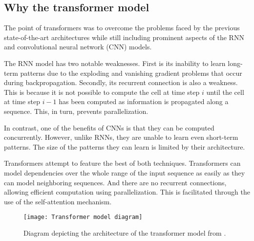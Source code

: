 \subsection{Why the transformer model}\label{sec:transformer intro}
The point of transformers was to overcome the problems faced by the previous state-of-the-art architectures while still including prominent aspects of the RNN and convolutional neural network (CNN) models.

The RNN model has two notable weaknesses. First is its inability to learn long-term patterns due to the exploding and vanishing gradient problems that occur during backpropagation.
Secondly, its recurrent connection is also a weakness. This is because it is not possible to compute the cell at time step $i$ until the cell at time step $i-1$ has been computed as information is propagated along a sequence.
This, in turn, prevents parallelization.

In contrast, one of the benefits of CNNs is that they can be computed concurrently. However, unlike RNNs, they are unable to learn even short-term patterns. The size of the patterns they can learn is limited by their architecture.

Transformers attempt to feature the best of both techniques.
Transformers can model dependencies over the whole range of the input sequence as easily as they can  model neighboring sequences. And there are no recurrent connections, allowing efficient computation using parallelization. This is facilitated through the use of the self-attention mechanism.\cite{TransformersScratchPeterbloem}

\begin{figure}[h]
  \centering
  \texttt{[image: Transformer model diagram]}
  \caption{Diagram depicting the architecture of the transformer model from \citet{AttentionIsAllYouNeed}.}
  \label{fig:original transformer}
\end{figure}